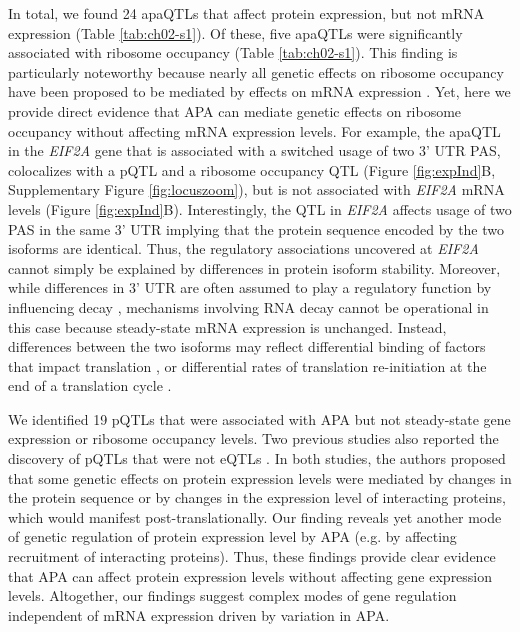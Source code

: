 In total, we found 24 apaQTLs that affect protein expression, but not mRNA expression (Table \ref{tab:ch02-s1}). Of these, five apaQTLs were significantly associated with ribosome occupancy (Table \ref{tab:ch02-s1}). This finding is particularly noteworthy because nearly all genetic effects on ribosome occupancy have been proposed to be mediated by effects on mRNA expression \citep{battle_genomic_2015}. Yet, here we provide direct evidence that APA can mediate genetic effects on ribosome occupancy without affecting mRNA expression levels. For example, the apaQTL in the {\it EIF2A} gene that is associated with a switched usage of two 3' UTR PAS, colocalizes with a pQTL and a ribosome occupancy QTL (Figure \ref{fig:expInd}B, Supplementary Figure \ref{fig:locuszoom}), but is not associated with {\it EIF2A} mRNA levels (Figure \ref{fig:expInd}B). Interestingly, the QTL in {\it EIF2A} affects usage of two PAS in the same 3' UTR implying that the protein sequence encoded by the two isoforms are identical. Thus, the regulatory associations uncovered at {\it EIF2A} cannot simply be explained by differences in protein isoform stability. Moreover, while differences in 3' UTR are often assumed to play a regulatory function by influencing decay \citep{mayr_regulation_2017}, mechanisms involving RNA decay cannot be operational in this case because steady-state mRNA expression is unchanged. Instead, differences between the two isoforms may reflect differential binding of factors that impact translation \citep{yamashita_translational_2017}, or differential rates of translation re-initiation at the end of a translation cycle \citep{rogers_ribosome_2017}. 

We identified 19 pQTLs that were associated with APA but not steady-state gene expression or ribosome occupancy levels. Two previous studies also reported the discovery of pQTLs that were not eQTLs \citep{battle_genomic_2015, chick_defining_2016}. In both studies, the authors proposed that some genetic effects on protein expression levels were mediated by changes in the protein sequence or by changes in the expression level of interacting proteins, which would manifest post-translationally. Our finding reveals yet another mode of genetic regulation of protein expression level by APA (e.g. by affecting recruitment of interacting proteins). Thus, these findings provide clear evidence that APA can affect protein expression levels without affecting gene expression levels. Altogether, our findings suggest complex modes of gene regulation independent of mRNA expression driven by variation in APA.


